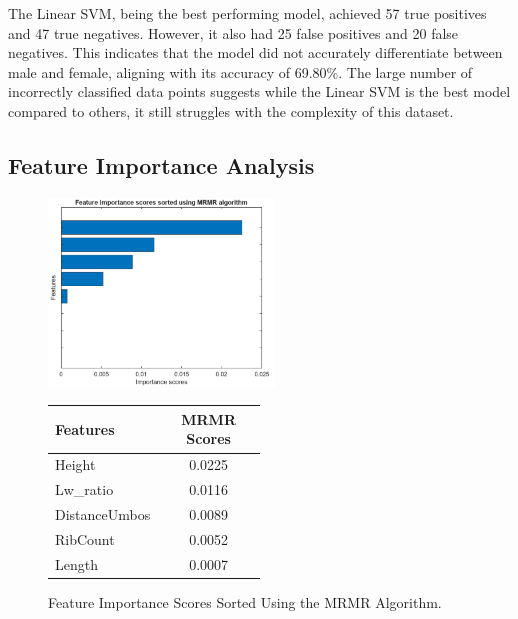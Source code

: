 The Linear SVM, being the best performing model, achieved 57 true positives and 47 true negatives. However, it also had 25 false positives and 20 false negatives. This indicates that the model did not accurately differentiate between male and female, aligning with its accuracy of 69.80\%. The large number of incorrectly classified data points suggests while the Linear SVM is the best model compared to others, it still struggles with the complexity of this dataset. 

\newpage
\subsection{Feature Importance Analysis}

\begin{figure}[!htbp]
	\centering
	\begin{minipage}{0.48\textwidth} 
		\centering
		\includegraphics[width=\textwidth, height=5cm]{figures/mrmr.png} 
	\end{minipage}%
	\hfill 
	\begin{minipage}{0.48\textwidth} 
		\centering
		{\fontsize{12}{15}\selectfont 
			\begin{tabular}{p{0.5\linewidth}c}
				\hline
				\textbf{Features} & \textbf{MRMR Scores} \\ \hline
				Height              & 0.0225  \\
				Lw\_ratio           & 0.0116  \\
				DistanceUmbos       & 0.0089  \\
				RibCount            & 0.0052  \\
				Length              & 0.0007  \\
				\hline
			\end{tabular}
		}
	\end{minipage}
	\caption{Feature Importance Scores Sorted Using the MRMR Algorithm.}
	\label{fig:mrmr-combined}
\end{figure}

